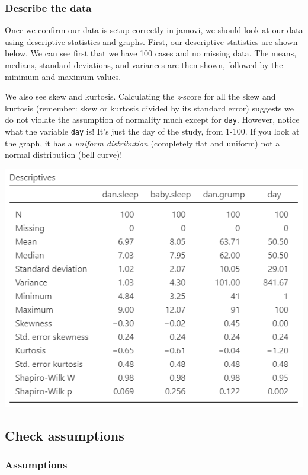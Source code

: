 \documentclass[
]{book}
\begin{document}
\hypertarget{describe-the-data-6}{%
\subsubsection{Describe the data}\label{describe-the-data-6}}

Once we confirm our data is setup correctly in jamovi, we should look at our data using descriptive statistics and graphs. First, our descriptive statistics are shown below. We can see first that we have 100 cases and no missing data. The means, medians, standard deviations, and variances are then shown, followed by the minimum and maximum values.

We also see skew and kurtosis. Calculating the \emph{z}-score for all the skew and kurtosis (remember: skew or kurtosis divided by its standard error) suggests we do not violate the assumption of normality much except for \texttt{day}. However, notice what the variable \texttt{day} is! It's just the day of the study, from 1-100. If you look at the graph, it has a \emph{uniform distribution} (completely flat and uniform) not a normal distribution (bell curve)!

\includegraphics{images/08-correlation/correlation-descriptives.png}

\hypertarget{check-assumptions-6}{%
\subsection{Check assumptions}\label{check-assumptions-6}}

\hypertarget{assumptions-6}{%
\subsubsection{Assumptions}\label{assumptions-6}}
\end{document}
